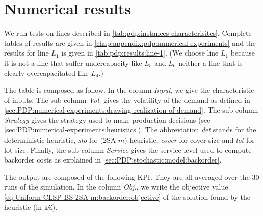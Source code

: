 \section{Numerical results}
\label{sec:PDP:numerical-experiments:numerical-results}


We run tests on lines described in \cref{tab:pdp:instances-characterisitcs}.
Complete tables of results are given in \cref{chap:appendix:pdp:numerical-experiments} and the results for line $L_1$ is given in \cref{tab:pdp:results:line-1}.
(We choose line $L_1$ because it is not a line that suffer undercapacity like $L_5$ and $L_6$ neither a line that is clearly overcapacitated like $L_4$.)


The table is composed as follow.
In the column \emph{Input}, we give the characteristic of inputs.
The sub-column \emph{Vol.} gives the volatility of the demand as defined in \cref{sec:PDP:numerical-experiments:drawing-realization-of-demand}.
The sub-column \emph{Strategy} gives the strategy used to make production decisions (see \cref{sec:PDP:numerical-experiments:heuristics}).
The abbreviation \emph{det} stands for the deterministic heuristic, \emph{sto} for (2SA-$m$) heuristic, \emph{cover} for cover-size and \emph{lot} for lot-size.
Finally, the sub-column \emph{Service} gives the service level used to compute backorder costs as explained in \cref{sec:PDP:stochastic:model:backorder}.


The output are composed of the following KPI.
They are all averaged over the 30 runs of the simulation.
In the column \emph{Obj.}, we write the objective value \cref{eq:Uniform-CLSP-BS-2SA-m:backorder:objective} of the solution found by the heuristic (in k\euro{}).


